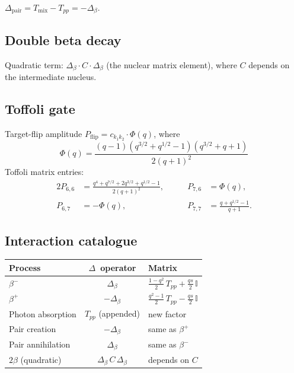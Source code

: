 \documentclass[12pt,a4paper]{article}
\newcommand{\II}{\mathbb{I}}
\begin{document}
$\Delta_{\mathrm{pair}} = T_{\mathrm{mix}} - T_{pp} = -\Delta_\beta$.

\subsection*{Double beta decay}

Quadratic term: $\Delta_\beta \cdot C \cdot \Delta_\beta$
(the nuclear matrix element), where $C$ depends on the intermediate
nucleus.

\subsection*{Toffoli gate}

Target-flip amplitude $P_{\mathrm{flip}} = c_{k_1 k_2} \cdot \Phi(q)$,
where
\[
  \boxed{\Phi(q)
  = \frac{(q-1)(q^{3/2} + q^{1/2} - 1)(q^{3/2} + q + 1)}{2(q+1)^2}}
\]
Toffoli matrix entries:
\begin{alignat*}{2}
  P_{6,6} &= \frac{q^4 + q^{7/2} + 2q^{3/2} + q^{1/2} - 1}{2(q+1)^2},
  &\qquad
  P_{7,6} &= \Phi(q), \\[4pt]
  P_{6,7} &= -\Phi(q),
  &\qquad
  P_{7,7} &= \frac{q + q^{1/2} - 1}{q + 1}.
\end{alignat*}

\subsection*{Interaction catalogue}

\begin{tabular}{@{} l c l @{}}
\toprule
\textbf{Process} & $\Delta$~\textbf{operator} & \textbf{Matrix} \\
\midrule
$\beta^-$
  & $\Delta_\beta$
  & $\frac{1-q^2}{2}\,T_{pp} + \frac{qs}{2}\,\II$ \\[4pt]
$\beta^+$
  & $-\Delta_\beta$
  & $\frac{q^2-1}{2}\,T_{pp} - \frac{qs}{2}\,\II$ \\[4pt]
Photon absorption
  & $T_{pp}$ (appended)
  & new factor \\[2pt]
Pair creation
  & $-\Delta_\beta$
  & same as $\beta^+$ \\[2pt]
Pair annihilation
  & $\Delta_\beta$
  & same as $\beta^-$ \\[2pt]
$2\beta$ (quadratic)
  & $\Delta_\beta\, C\, \Delta_\beta$
  & depends on $C$ \\[2pt]
\bottomrule
\end{tabular}

\end{document}

